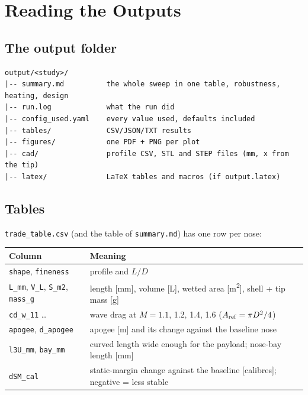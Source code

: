 \section{Reading the Outputs}
\label{sec:outputs}

\subsection{The output folder}

\begin{lstlisting}[language={}]
output/<study>/
|-- summary.md          the whole sweep in one table, robustness, heating, design
|-- run.log             what the run did
|-- config_used.yaml    every value used, defaults included
|-- tables/             CSV/JSON/TXT results
|-- figures/            one PDF + PNG per plot
|-- cad/                profile CSV, STL and STEP files (mm, x from the tip)
|-- latex/              LaTeX tables and macros (if output.latex)
\end{lstlisting}

\subsection{Tables}

\texttt{trade\_table.csv} (and the table of \texttt{summary.md}) has one row per nose:

\begin{table}[H]
\centering
\footnotesize
\begin{tabular}{@{}>{\raggedright\arraybackslash}p{3.0cm}>{\raggedright\arraybackslash}p{13.0cm}@{}}
\toprule
Column & Meaning \\
\midrule
\texttt{shape}, \texttt{fineness} & profile and $L/D$ \\
\texttt{L\_mm}, \texttt{V\_L}, \texttt{S\_m2}, \texttt{mass\_g} & length [mm], volume [L], wetted area [m\textsuperscript{2}], shell + tip mass [g] \\
\texttt{cd\_w\_11} \dots & wave drag at $M = 1.1$, 1.2, 1.4, 1.6 ($A_{\rm ref} = \pi D^2/4$) \\
\texttt{apogee}, \texttt{d\_apogee} & apogee [m] and its change against the baseline nose \\
\texttt{l3U\_mm}, \texttt{bay\_mm} & curved length wide enough for the payload; nose-bay length [mm] \\
\texttt{dSM\_cal} & static-margin change against the baseline [calibres]; negative = less stable \\
\bottomrule
\end{tabular}
\end{table}


